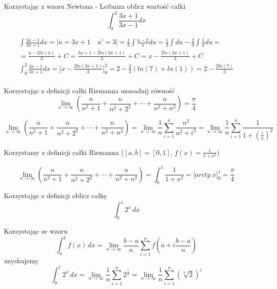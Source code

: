 \documentclass[main.tex]{subfiles}
\begin{document}
    \begin{exercise}
        Korzystając z wzoru Newtona - Leibniza oblicz wartość całki \[\int_0^2 \frac{3x + 1}{3x - 1}dx\]
    \end{exercise}

    \begin{gather*}
        \int\frac{3x - 1}{3x + 1} dx = \big| u = 3x + 1 \quad u' = 3\big| = \frac{1}{3}\int \frac{u - 2}{u}du
        = \frac{1}{3} \int du - \frac{2}{3}\int\frac{1}{u}du =\\
        = \frac{u - 2ln(u)}{3} + C = \frac{3x + 1 - 2ln(3x + 1)}{3} + C = x - \frac{2ln(3x + 1)}{3} + C\\
        \int_0^2\frac{3x - 1}{3x + 1} dx = \big[ x - \frac{2ln(3x + 1)}{3} \big]^2_0 = 2 - \frac{2}{3}(ln(7) + ln(1)) = 2 - \frac{2ln(7)}{3}\\
    \end{gather*}

    \begin{exercise}
        Korzystając z definicji całki Riemanna uzasadnij równość \[\lim_{n \rightarrow \infty} \left(\frac{n}{n^2 + 1} + \frac{n}{n^2 + 2^2} + \cdots + \frac{n}{n^2 + n^2}\right) = \frac{\pi}{4}\]
    \end{exercise}

    \[\lim_{n \rightarrow \infty} \left(\frac{n}{n^2 + 1} + \frac{n}{n^2 + 2^2} + \cdots + \frac{n}{n^2 + n^2}\right) =
    \lim_{n \rightarrow \infty} \frac{1}{n} \sum_{i =1}^{n} \frac{n^2}{n^2 + i^2} = \lim_{n \rightarrow \infty} \frac{1}{n} \sum_{i =1}^{n} \frac{1}{1 + \left(\frac{i}{n}\right)^2} \]

    Korzystamy z definicji całki Riemanna ($[a, b] = [0, 1]$, $f(x) = \frac{1}{1 + x^2})$

    \[\lim_{n \rightarrow \infty} \left(\frac{n}{n^2 + 1} + \frac{n}{n^2 + 2^2} + \cdots + \frac{n}{n^2 + n^2}\right) = \int_0^1 \frac{1}{1 + x^2}= \big[arctg \; x \big]^1_0 = \frac{\pi}{4}\]

    \begin{exercise}
        Korzystając z definicji oblicz całkę
        \[\int_0^1 2^x \,dx\]
    \end{exercise}

    Korzystając ze wzoru
    \[\int_a^b f(x) \,dx = \lim_{n \rightarrow \infty} \frac{b - a}{n} \sum_{i =1}^{n} f\left(a + i\frac{b - a}{n}\right) \]
    uzyskujemy
    \[\int_0^1 2^x \,dx = \lim_{n \rightarrow \infty} \frac{1}{n} \sum_{i =1}^{n} 2^{\frac{i}{n}}
    = \lim_{n \rightarrow \infty} \frac{1}{n} \sum_{i =1}^{n} \left(\sqrt[n]{2}\right)^i \]
\end{document}
